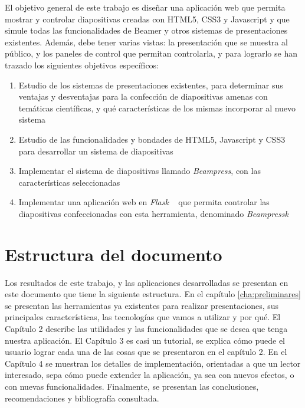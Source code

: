 \begin{introduction}
		El objetivo general de este trabajo es diseñar una aplicación web que permita mostrar y controlar diapositivas creadas con HTML5, CSS3 y Javascript y que simule todas las funcionalidades de Beamer y otros sistemas de presentaciones existentes. Además, debe tener varias vistas: la presentación que se muestra al público, y los paneles de control que permitan controlarla, y para lograrlo se han trazado los siguientes objetivos específicos:

		\begin{enumerate}
			\item Estudio de los sistemas de presentaciones existentes, para determinar sus ventajas y desventajas para la confección de diapositivas amenas con temáticas científicas, y qué características de los mismas incorporar al nuevo sistema
			\item Estudio de las funcionalidades y bondades de HTML5, Javascript y CSS3 para desarrollar un sistema de diapositivas
			\item Implementar el sistema de diapositivas llamado \textit{Beampress}, con las características seleccionadas
			\item Implementar una aplicación web en \textit{Flask} ~\cite{flask} que permita controlar las diapositivas confeccionadas con esta herramienta, denominado \textit{Beampressk}
		\end{enumerate}

	\section{Estructura del documento} %
	\label{sec:estructura_del_documento}
	
		Los resultados de este trabajo, y las aplicaciones desarrolladas se presentan en este documento que tiene la siguiente estructura. En el capítulo \ref{cha:preliminares} se presentan las herramientas ya existentes para realizar presentaciones, sus principales características, las tecnologías que vamos a utilizar y por qué. El Capítulo 2 describe las utilidades y las funcionalidades que se desea que tenga nuestra aplicación. El Capítulo 3 es casi un tutorial, se explica cómo puede el usuario lograr cada una de las cosas que se presentaron en el capítulo 2. En el Capítulo 4 se muestran los detalles de implementación, orientadas a que un lector interesado, sepa cómo puede extender la aplicación, ya sea con nuevos efectos, o con nuevas funcionalidades. Finalmente, se presentan las conclusiones, recomendaciones y bibliografía consultada.





\end{introduction}




